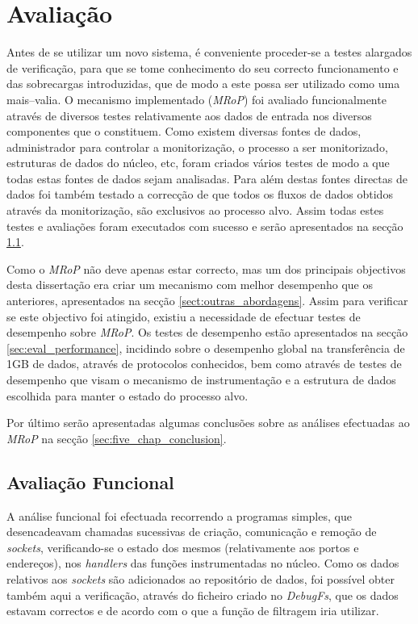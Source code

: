 \chapter{Avaliação}
\label{cap:avaliacao}

Antes de se utilizar um novo sistema, é conveniente proceder-se a testes alargados de verificação, para que se tome conhecimento do seu correcto funcionamento e das sobrecargas introduzidas, que de modo a este possa ser utilizado como uma mais–valia.
O mecanismo implementado (\textit{MRoP}) foi avaliado funcionalmente através de diversos testes relativamente aos dados de entrada nos diversos componentes que o constituem.
Como existem diversas fontes de dados, administrador para controlar a monitorização, o processo a ser monitorizado, estruturas de dados do núcleo, etc, foram criados vários testes de modo a que todas estas fontes de dados sejam analisadas.
Para além destas fontes directas de dados foi também testado a correcção de que todos os fluxos de dados obtidos através da monitorização, são exclusivos ao processo alvo.
Assim todas estes testes e avaliações foram executados com sucesso e serão apresentados na secção \ref{sec:eval_functional}.

Como o \textit{MRoP} não deve apenas estar correcto, mas um dos principais objectivos desta dissertação era criar um mecanismo com melhor desempenho que os anteriores, apresentados na secção \ref{sect:outras_abordagens}.
Assim para verificar se este objectivo foi atingido, existiu a necessidade de efectuar testes de desempenho sobre \textit{MRoP}.
Os testes de desempenho estão apresentados na secção \ref{sec:eval_performance}, incidindo sobre o desempenho global na transferência de 1GB de dados, através de protocolos conhecidos, bem como através de testes de desempenho que visam o mecanismo de instrumentação e a estrutura de dados escolhida para manter o estado do processo alvo.

Por último serão apresentadas algumas conclusões sobre as análises efectuadas ao \textit{MRoP} na secção \ref{sec:five_chap_conclusion}.

\section{Avaliação Funcional}
\label{sec:eval_functional}


A análise funcional foi efectuada recorrendo a programas simples, que desencadeavam chamadas sucessivas de criação, comunicação e remoção de \textit{sockets}, verificando-se o estado dos mesmos (relativamente aos portos e endereços), nos \textit{handlers} das funções instrumentadas no núcleo.
Como os dados relativos aos \textit{sockets} são adicionados ao repositório de dados, foi possível obter também aqui a verificação, através do ficheiro criado no \textit{DebugFs}, que os dados estavam correctos e de acordo com o que a função de filtragem iria utilizar.

